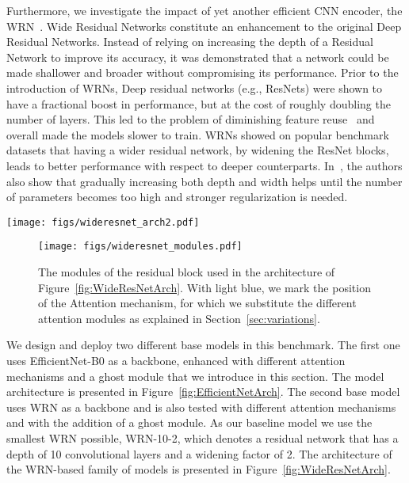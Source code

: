 \documentclass[journal]{IEEEtran}
\begin{document}
Furthermore, we investigate the impact of yet another efficient CNN encoder, the WRN~\citep{DBLP:journals/corr/ZagoruykoK16}. Wide Residual Networks constitute an enhancement to the original Deep Residual Networks. Instead of relying on  increasing the depth of a Residual Network to improve its accuracy, it was demonstrated that a network could be made shallower and broader without compromising its performance. Prior to the introduction of WRNs, Deep residual networks (e.g., ResNets) were shown to have a fractional boost in performance, but at the cost of roughly doubling the number of layers. This led to the problem of diminishing feature reuse~\citep{DBLP:journals/corr/SrivastavaGS15} and overall made the models slower to train. WRNs showed on popular benchmark datasets that having a wider residual network, by widening the ResNet blocks, leads to better  performance  with  respect to deeper counterparts. In~\cite{DBLP:journals/corr/ZagoruykoK16}, the authors also show that  gradually increasing both depth and width helps until the number of parameters becomes too high and stronger regularization is needed.

\begin{figure*}[ht]
 \texttt{[image: figs/wideresnet\_arch2.pdf]}
 \centering
\caption{Our WRN base model architecture implemented in the benchmark. The blocks of the architecture are explained in Figure~\ref{fig:WRNModules}.}
\label{fig:WideResNetArch}
\end{figure*}

\begin{figure}[h]
 \texttt{[image: figs/wideresnet\_modules.pdf]}
 \centering
\caption{The modules of the residual block used in the architecture of Figure~\ref{fig:WideResNetArch}. With light blue, we mark the position of the Attention mechanism, for which we substitute the different attention modules as explained in Section~\ref{sec:variations}.}
\label{fig:WRNModules}
\end{figure}



We design and deploy two different base models in this benchmark. The first one uses EfficientNet-B0 as a backbone, enhanced with different attention mechanisms and a ghost module that we introduce in this section. The model architecture is presented in Figure~\ref{fig:EfficientNetArch}. The second base model uses WRN as a backbone and is also tested with different attention mechanisms and with the addition of a ghost module. As our baseline model we use the smallest WRN possible, WRN-10-2, which denotes a residual network that has a depth of 10 convolutional layers and a widening factor of 2. The architecture of the WRN-based family of models is presented in Figure~\ref{fig:WideResNetArch}. 
\end{document}
